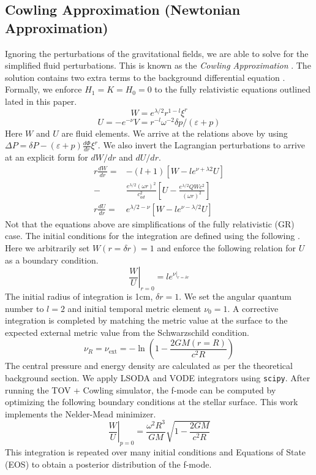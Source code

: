 \documentclass[aps,prd,twocolumn,superscriptaddress,footinbib]{revtex4-1}
\begin{document}
\subsection{Cowling Approximation (Newtonian Approximation)}
Ignoring the perturbations of the gravitational fields, we are able to solve for the simplified fluid perturbations. This is known as the \textit{Cowling Approximation} \cite{cowling1941non}. The solution contains two extra terms to the background differential equation \cite{2204}. Formally, we enforce $H_1 = K = H_0 = 0$ to the fully relativistic equations outlined lated in this paper. \[W=e^{\lambda / 2} r^{1-l} \xi^{r}\]\[U=-e^{-\nu} V= r^{-l} \omega^{-2} \delta p /(\varepsilon+p)\] Here $W$ and $U$ are fluid elements. We arrive at the relations above by using $\Delta P=\delta P-(\varepsilon+p) \frac{d \Phi}{d r} \xi^{r}$. We also invert the Lagrangian perturbations to arrive at an explicit form for $dW/dr$ and $dU/dr$.  
\begin{align} %
   r\frac{dW}{dr} = & -(l+1) \left[W - l e^{\nu + \lambda 2} U \right] \\ -& \frac{e^{\lambda/2}(\omega r)^2}{c_{ad}^2} \left[U - \frac{e^{\lambda/2}QWc^2}{(\omega r)^2} \right] \\ r \frac{dU}{dr} = & e^{\lambda/2 - \nu} \left[W - l e^{\nu - \lambda/2} U\right]
\end{align}
Not that the equations above are simplifications of the fully relativistic (GR) case. The initial conditions for the integration are defined using the following \cite{2205}. Here we arbitrarily set $W(r = \delta r) = 1$ and enforce the following relation for $U$ as a boundary condition. 
\begin{equation}
\left.\frac{W}{U}\right|_{r=0}=l e^{\left.\nu\right|_{r=\delta r}}
\end{equation}
The initial radius of integration is 1cm, $\delta r = 1$. We set the angular quantum number to $l = 2$ and initial temporal metric element $\nu_0 = 1$. A corrective integration is completed by matching the metric value at the surface to the expected external metric value from the Schwarzschild condition. 
\begin{equation}
    \nu_R = \nu_{\text{ext}} = -\ln{\left(1 - \frac{2GM(r=R)}{c^2R}\right)}
\end{equation} 
The central pressure and energy density are calculated as per the theoretical background section. We apply LSODA and VODE integrators using \texttt{scipy}. After running the TOV + Cowling simulator, the f-mode can be computed by optimizing the following boundary conditions at the stellar surface. This work implements the Nelder-Mead minimizer. 
\begin{equation}
\left.\frac{W}{U}\right|_{p=0}=\frac{\omega^{2} R^{3}}{G M} \sqrt{1-\frac{2 G M}{c^{2} R}}
\end{equation}
This integration is repeated over many initial conditions and Equations of State (EOS) to obtain a posterior distribution of the f-mode. 
\end{document}
